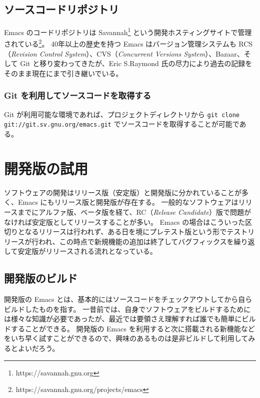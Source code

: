 \subsection{ソースコードリポジトリ}
Emacs のコードリポジトリは Savannah\footnote{https://savannah.gnu.org} という開発ホスティングサイトで管理されている\footnote{https://savannah.gnu.org/projects/emacs}。
40年以上の歴史を持つ Emacs はバージョン管理システムも RCS（\emph{Revision Control System}）、CVS（\emph{Concurrent Versions System}）、Bazaar、そして Git と移り変わってきたが、Eric S.Raymond 氏の尽力により過去の記録をそのまま現在にまで引き継いでいる。
\subsubsection{Git を利用してソースコードを取得する}
Git が利用可能な環境であれば、プロジェクトディレクトリから \texttt{git clone git://git.sv.gnu.org/emacs.git} でソースコードを取得することが可能である。
\section{開発版の試用}
ソフトウェアの開発はリリース版（安定版）と開発版に分かれていることが多く、Emacs にもリリース版と開発版が存在する。
一般的なソフトウェアはリリースまでにアルファ版、ベータ版を経て、RC（\emph{Release Candidate}）版で問題がなければ安定版としてリリースすることが多い。
Emacs の場合はこういった区切りとなるリリースは行われず、ある日を境にプレテスト版という形でテストリリースが行われ、この時点で新規機能の追加は終了してバグフィックスを繰り返して安定版がリリースされる流れとなっている。
\subsection{開発版のビルド}
開発版の Emacs とは、基本的にはソースコードをチェックアウトしてから自らビルドしたものを指す。
一昔前では、自身でソフトウェアをビルドするためには様々な知識が必要であったが、最近では要領さえ理解すれば誰でも簡単にビルドすることができる。
開発版の Emacs を利用すると次に搭載される新機能などをいち早く試すことができるので、興味のあるものは是非ビルドして利用してみるとよいだろう。
